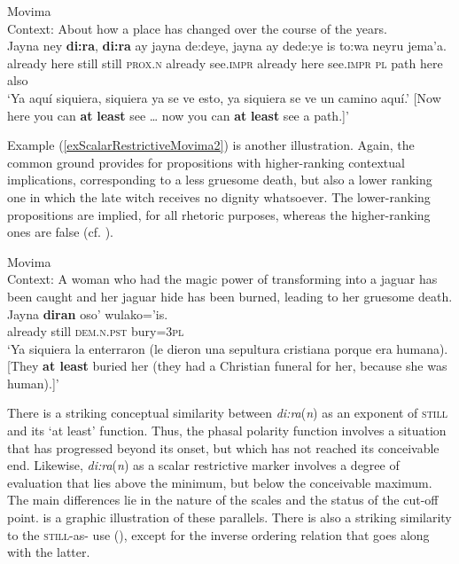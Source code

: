 \begin{exe}
	\ex Movima\label{exScalarRestrictiveMovima1}\\
	Context: About how a place has changed over the course of the years.\\
	\gll Jayna ney \textbf{di:ra}, \textbf{di:ra} ay jayna de:deye, jayna ay dede:ye is to:wa neyru jema'a.\\
	already here still still \textsc{prox}.\textsc{n} already see.\textsc{impr} already here see.\textsc{impr} \textsc{pl} path here also\\
	\glt \lq Ya aquí siquiera, siquiera ya se ve esto, ya siquiera se ve un camino aquí.' [Now here you can \textbf{at} \textbf{least} see … now you can \textbf{at} \textbf{least} see a path.]\rq{ }\parencite{MovimaCorpus}
\end{exe}

Example (\ref{exScalarRestrictiveMovima2}) is another illustration. Again, the common ground provides for propositions with higher-ranking contextual implications, corresponding to a less gruesome death, but also a lower ranking one in which the late witch receives no dignity whatsoever. The lower-ranking propositions are implied, for all rhetoric purposes, whereas the higher-ranking ones are false (cf. \cite{Gast2012}). 
		
\begin{exe}
	\ex Movima\label{exScalarRestrictiveMovima2}\\
	Context: A woman who had the magic power of transforming into a jaguar has been caught and her jaguar hide has been burned, leading to her gruesome death.\\
	\gll Jayna \textbf{diran} oso' wulako='is.\\
	already still \textsc{dem}.\textsc{n}.\textsc{pst} bury=3\textsc{pl}\\
	\glt \lq Ya siquiera la enterraron (le dieron una sepultura cristiana porque era humana). [They \textbf{at least} buried her (they had a Christian funeral for her, because she was human).]\rq{ }\parencite{MovimaCorpus}
\end{exe}	

There is a striking conceptual similarity between \mbox{\textit{di:ra}(\textit{n})} as an exponent of \textsc{still} and its \lq at least' function. Thus, the phasal polarity function involves a situation that has progressed beyond its onset, but which has not reached its conceivable end. Likewise, \mbox{\textit{di:ra}(\textit{n})} as a scalar restrictive marker involves a degree of evaluation that lies above the minimum, but below the conceivable maximum. The main differences lie in the nature of the scales and the status of the cut-off point.  is a graphic illustration of these parallels. There is also a striking similarity to the \textsc{still}-as- use (), except for the inverse ordering relation that goes along with the latter.

